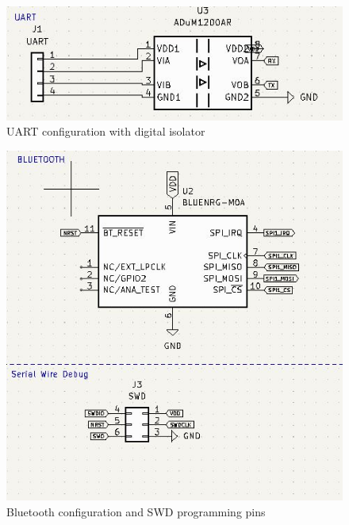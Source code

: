 \begin{figure} [H]
\begin{center}
\includegraphics[scale=0.8]{images/UART.jpg}
   \caption{UART configuration with digital isolator}
    \label{fig:MCUuart}
\end{center}
\end{figure}

\begin{figure} [H]
\begin{center}
\includegraphics[scale=0.7]{images/BLE_SWD.jpg}
   \caption{Bluetooth configuration and SWD programming pins}
    \label{fig:MCUBLE}
\end{center}
\end{figure}
